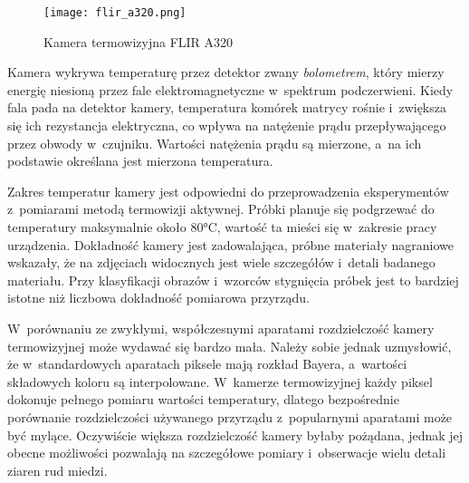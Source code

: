 \begin{figure}[h]
    \centering
    \texttt{[image: flir\_a320.png]}
    \caption{Kamera termowizyjna FLIR A320}
    \label{fig:camera}
\end{figure}

Kamera wykrywa temperaturę przez detektor zwany \emph{bolometrem},
który mierzy energię niesioną przez fale elektromagnetyczne w~spektrum
podczerwieni.
Kiedy fala pada na detektor kamery, temperatura komórek matrycy rośnie
i~zwiększa się ich rezystancja elektryczna, co wpływa na natężenie prądu
przepływającego przez obwody w~czujniku.
Wartości natężenia prądu są mierzone, a~na ich podstawie określana jest
mierzona temperatura.

Zakres temperatur kamery jest odpowiedni do przeprowadzenia eksperymentów
z~pomiarami metodą termowizji aktywnej.
Próbki planuje się podgrzewać do temperatury maksymalnie około
\num{80}\si{\celsius}, wartość ta mieści się w~zakresie pracy urządzenia.
Dokładność kamery jest zadowalająca, próbne materiały nagraniowe
wskazały, że na zdjęciach widocznych jest wiele szczegółów i~detali
badanego materiału.
Przy klasyfikacji obrazów i~wzorców stygnięcia próbek jest to 
bardziej istotne niż liczbowa dokładność pomiarowa przyrządu.

W~porównaniu ze zwykłymi, współczesnymi aparatami rozdzielczość kamery
termowizyjnej może wydawać się bardzo mała.
Należy sobie jednak uzmysłowić, że w~standardowych aparatach piksele mają
rozkład Bayera, a~wartości składowych koloru są interpolowane.
W~kamerze termowizyjnej każdy piksel dokonuje pełnego pomiaru wartości
temperatury, dlatego bezpośrednie porównanie rozdzielczości używanego
przyrządu z~popularnymi aparatami może być mylące.
Oczywiście większa rozdzielczość kamery byłaby pożądana, jednak jej obecne
możliwości pozwalają na szczegółowe pomiary i~obserwacje wielu detali ziaren
rud miedzi.

